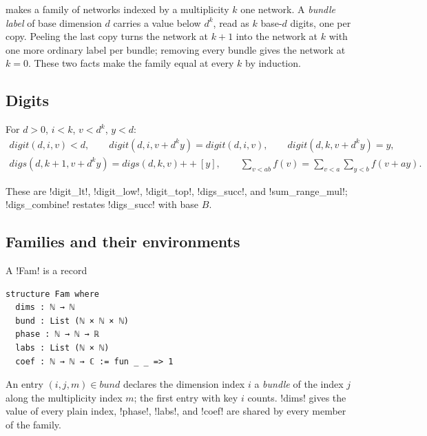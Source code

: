 { makes a family of networks indexed by a multiplicity $k$ one network. A \emph{bundle label} of base dimension $d$ carries a value below $d^k$, read as $k$ base-$d$ digits, one per copy. Peeling the last copy turns the network at $k+1$ into the network at $k$ with one more ordinary label per bundle; removing every bundle gives the network at $k=0$. These two facts make the family equal at every $k$ by induction.

\subsection{Digits}

\begin{lemma}\label{lem:boxes-digits}
For $d>0$, $i<k$, $v<d^k$, $y<d$:
\begin{gather*}
\mathit{digit}(d,i,v)<d,\qquad
\mathit{digit}(d,i,v+d^k y)=\mathit{digit}(d,i,v),\qquad
\mathit{digit}(d,k,v+d^k y)=y,\\
\mathit{digs}(d,k+1,v+d^k y)=\mathit{digs}(d,k,v)\mathbin{+\!\!+}[y],\qquad
\sum_{v<ab}f(v)=\sum_{v<a}\sum_{y<b}f(v+ay).
\end{gather*}
\end{lemma}
These are \lbx!digit_lt!, \lbx!digit_low!, \lbx!digit_top!, \lbx!digs_succ!, and \lbx!sum_range_mul!; \lbx!digs_combine! restates \lbx!digs_succ! with base $B$.

\subsection{Families and their environments}

\begin{definition}[Family]\label{def:boxes-fam}
A \lbx!Fam! is a record
\begin{lstlisting}[style=leanbox]
structure Fam where
  dims : ℕ → ℕ
  bund : List (ℕ × ℕ × ℕ)
  phase : ℕ → ℕ → ℝ
  labs : List (ℕ × ℕ)
  coef : ℕ → ℕ → ℂ := fun _ _ => 1
\end{lstlisting}
An entry $(i,j,m)\in\mathit{bund}$ declares the dimension index $i$ a \emph{bundle} of the index $j$ along the multiplicity index $m$; the first entry with key $i$ counts. \lbx!dims! gives the value of every plain index, \lbx!phase!, \lbx!labs!, and \lbx!coef! are shared by every member of the family.
\end{definition}

}
